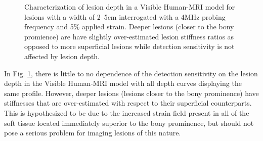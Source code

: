 			\begin{figure}[!t]
				\centering
				\caption[Lesion depth in a Visible Human-MRI model]{Characterization of lesion depth in a Visible Human-MRI model for lesions with a width of \unit{2.5}{cm} interrogated with a \unit{4}{MHz} probing frequency and \unit{5}{\%} applied strain. Deeper lesions (closer to the bony promience) are have slightly over-estimated lesion stiffness ratios as opposed to more superficial lesions while detection sensitivity is not affected by lesion depth.}
				\label{fig:human_depth_characterization}
			\end{figure}

			In Fig. \ref{fig:human_depth_characterization}, there is little to no dependence of the detection sensitivity on the lesion depth in the Visible Human-MRI model with all depth curves displaying the same profile. However, deeper lesions (lesions closer to the bony prominence) have stiffnesses that are over-estimated with respect to their superficial counterparts. This is hypothesized to be due to the increased strain field present in all of the soft tissue located immediately superior to the bony prominence, but should not pose a serious problem for imaging lesions of this nature.

